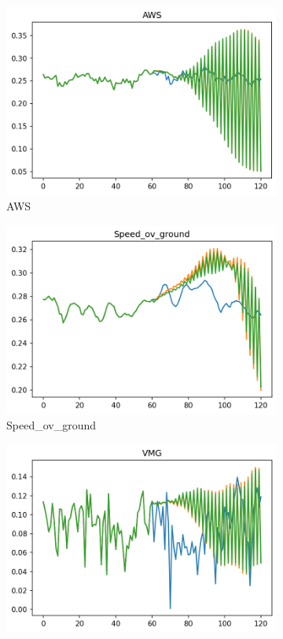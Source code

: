 \documentclass[12pt,twoside]{report}
\begin{document}
\begin{figure}[h]
\begin{subfigure}[b]{0.32\textwidth}
         \includegraphics[width=\textwidth]{figures/prediction-plots-compared/AWS.png}
         \caption{AWS}
     \end{subfigure}
     \begin{subfigure}[b]{0.32\textwidth}
         \centering
         \includegraphics[width=\textwidth]{figures/prediction-plots-compared/Speed_ov_ground.png}
         \caption{Speed\_ov\_ground}
     \end{subfigure}
     \begin{subfigure}[b]{0.32\textwidth}
         \centering
         \includegraphics[width=\textwidth]{figures/prediction-plots-compared/VMG.png}

\end{subfigure}
\end{figure}
\end{document}
